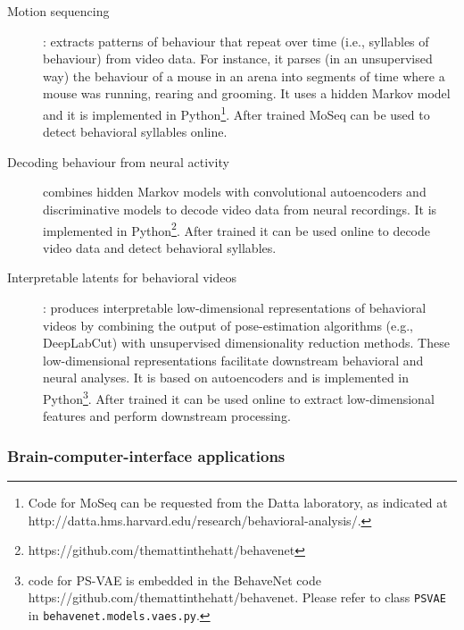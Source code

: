 \begin{description}

    \item[Motion sequencing]\citep[MoSeq;][]{wiltschkoEtAl15}: extracts patterns
        of behaviour that repeat over time (i.e., syllables of behaviour) from
        video data. For instance, it parses (in an unsupervised way) the
        behaviour of a mouse in an arena into segments of time where a mouse
        was running, rearing and grooming. It uses a hidden Markov model and it
        is implemented in Python\footnote{Code for MoSeq can be requested from
        the Datta laboratory, as indicated at
        http://datta.hms.harvard.edu/research/behavioral-analysis/.}.
        After trained MoSeq can be used to detect behavioral syllables online.

    \item[Decoding behaviour from neural
        activity]\citep[BehaveNet;][]{battyEtAl19} combines hidden Markov
        models with convolutional autoencoders and discriminative models to
        decode video data from neural recordings. It is implemented in
        Python\footnote{https://github.com/themattinthehatt/behavenet}.
        After trained it can be used online to decode video data and detect
        behavioral syllables.

    \item[Interpretable latents for behavioral videos]\citep[Partitioned
        Subspace Variational Autoencoder, PS-VAE;][]{whitewayEtAl21}: produces
        interpretable low-dimensional representations of behavioral videos by
        combining the output of pose-estimation algorithms (e.g., DeepLabCut)
        with unsupervised dimensionality reduction methods. These
        low-dimensional representations facilitate downstream behavioral and
        neural analyses. It is based on autoencoders and is implemented in
        Python\footnote{code for PS-VAE is embedded in the BehaveNet code
        https://github.com/themattinthehatt/behavenet.
        Please refer to class \texttt{PSVAE} in 
        \texttt{behavenet.models.vaes.py}.}. After trained it can be used
        online to extract low-dimensional features and perform downstream
        processing.

\end{description}

\subsubsection{Brain-computer-interface applications}
\label{sec:bci}

